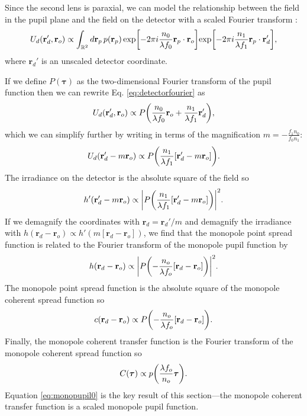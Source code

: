 \documentclass[]{osa-article}
\let\originalleft\left
\let\originalright\right
\renewcommand{\left}{\mathopen{}\mathclose\bgroup\originalleft}
\renewcommand{\right}{\aftergroup\egroup\originalright}
\providecommand{\ro}{\mathbf{\mathbf{r}}_o}
\providecommand{\rp}{\mathbf{r}_p}
\providecommand{\rd}{\mathbf{r}_d}
\providecommand{\mbb}[1]{\mathbb{#1}}
\providecommand{\bs}[1]{\boldsymbol{#1}}
\providecommand{\taup}{\bs{\tau}}
\begin{document}
Since the second lens is paraxial, we can model the relationship between the
field in the pupil plane and the field on the detector with a scaled Fourier
transform \cite{goodman1996, axelrod2012, backer2014}:
\begin{align}
   U_d(\rd', \ro) \propto \int_{\mbb{R}^2}d\rp\, p(\rp)\,\text{exp}\left[-2\pi i \frac{n_0}{\lambda f_0} \rp\cdot\ro \right]\text{exp}\left[-2\pi i \frac{n_1}{\lambda f_1} \rp\cdot\rd' \right], \label{eq:detectorfourier}
\end{align}
where $\rd'$ is an unscaled detector coordinate.

If we define $P(\taup)$ as the two-dimensional Fourier transform of the pupil function
then we can rewrite Eq. \eqref{eq:detectorfourier} as
\begin{align}
  U_d(\rd', \ro) \propto P\left(\frac{n_0}{\lambda f_0}\ro + \frac{n_1}{\lambda f_1}\rd'\right),
\end{align}
which we can simplify further by writing in terms of the magnification
$m = -\frac{f_1n_0}{f_0n_1}$:
\begin{align}
  U_d(\rd' - m\ro) \propto P\left(\frac{n_1}{\lambda f_1}[\rd' - m\ro]\right).
\end{align}
The irradiance on the detector is the absolute square of the field so
\begin{align}
  h'(\rd' - m\ro) \propto \left|P\left(\frac{n_1}{\lambda f_1}[\rd' - m\ro]\right)\right|^2.
\end{align}
If we demagnify the coordinates with $\rd = \rd'/m$ and demagnify the irradiance
with $h(\rd - \ro) \propto h'(m[\rd - \ro])$, we find that the monopole point
spread function is related to the Fourier transform of the monopole pupil
function by
\begin{align}
  h(\rd - \ro) \propto \left|P\left(-\frac{n_o}{\lambda f_o}[\rd - \ro]\right)\right|^2.
\end{align}
The monopole point spread function is the absolute square of the monopole
coherent spread function so
\begin{align}
  c(\rd - \ro) \propto P\left(-\frac{n_o}{\lambda f_o}[\rd - \ro]\right).
\end{align}
Finally, the monopole coherent transfer function is the Fourier transform of the
monopole coherent spread function so
\begin{align}
  C(\taup) \propto p\left(\frac{\lambda f_o}{n_o}\taup\right). \label{eq:monopupil0}
\end{align}
Equation \eqref{eq:monopupil0} is the key result of this section---the monopole
coherent transfer function is a scaled monopole pupil function.
\end{document}
